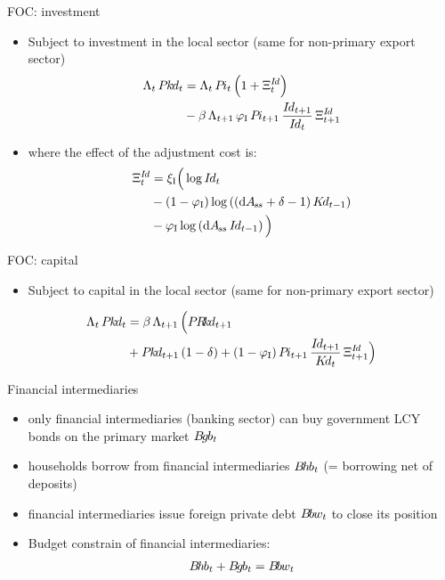 \begin{frame}{FOC: investment}
  \vspace{-5mm}
  \begin{itemize}
    \item Subject to investment in the local sector (same for non-primary export sector)
    \begin{align*}
      \small
      \Lambda_t\,\Pkd_t &= \Lambda_t\,\Pii_t\,\Big(1 + \Xi^{\Id}_t\Big) \notag\\
      & - \beta\,\Lambda_{t+1} \, \varphi_{\ii} \, \Pii_{t+1}\,\frac{\Id_{t+1}}{\Id_{t}} \, \Xi^{\Id}_{t+1}
    \end{align*}
    \item where the effect of the adjustment cost is:
    \vspace{-5mm}
    \begin{align*}
      \small
      \Xi^{\Id}_t &=  \xi_{\ii } \Big(\log\Id_t \notag\\
      &-(1-\varphi_{\ii})\log\left((\sst{\gr A} + \delta -1) \, \Kd_{t-1}\right) \notag\\
      &- \varphi_{\ii} \log \left( \sst{\gr A} \, \Id_{t-1}\right) \Big)
    \end{align*}
  \end{itemize}
\end{frame}   

\begin{frame}{FOC: capital}
  \begin{itemize}
    \item Subject to capital in the local sector (same for non-primary export sector)  
  \end{itemize}
  \small
  \begin{align*}
    \Lambda_t\,\Pkd_t &= \beta\,\Lambda_{t+1}\,\Big(\PRkd_{t+1} \notag \\
    &+ \Pkd_{t+1}\left(1 - \delta\right) + \left(1-\varphi_{\ii}\right) \Pii_{t+1}\,\frac{\Id_{t+1}}{\Kd_{t}} \, \Xi^{\Id}_{t+1}\Big)
  \end{align*}
\end{frame}

\startframecont
\begin{frame}{Financial intermediaries}
  \begin{itemize}
    \item only financial intermediaries (banking sector) can buy government LCY bonds on the primary market $B\hspace{-0.15em}g\hspace{-0.075em}b_t$ 
    \item households borrow from financial intermediaries $B\hspace{-0.15em}h\hspace{-0.075em}b_t$ (= borrowing net of deposits)
    \item financial intermediaries issue foreign private debt $B\hspace{-0.15em}b\hspace{-0.075em}w_t$ to close its position
    \item Budget constrain of financial intermediaries:
    \vspace{-3mm}
    \begin{align*}
      B\hspace{-0.15em}h\hspace{-0.075em}b_t + B\hspace{-0.15em}g\hspace{-0.075em}b_t = B\hspace{-0.15em}b\hspace{-0.075em}w_t
    \end{align*}
  \end{itemize}
\end{frame}

